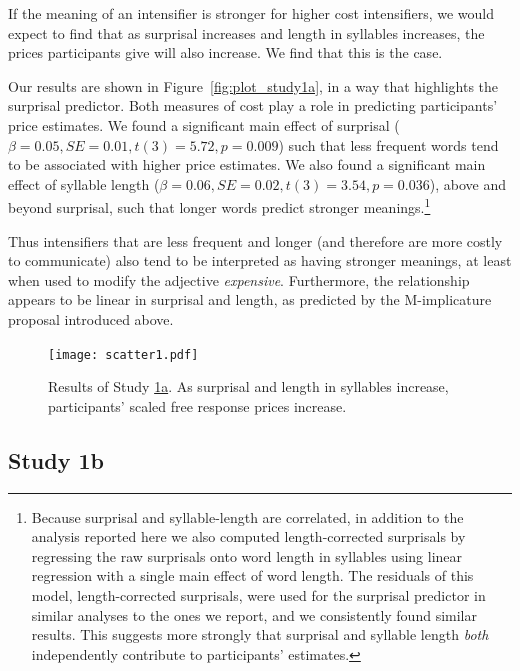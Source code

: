 \documentclass[10pt,letterpaper]{article}
\newcommand{\todo}[1]{{\color{red}#1}}
\begin{document}
\todo{

If the meaning of an intensifier is stronger for higher cost intensifiers, we would expect to find that as surprisal increases and length in syllables increases, the prices participants give will also increase. We find that this is the case.

Our results are shown in Figure~\ref{fig:plot_study1a}, in a way that highlights the surprisal predictor. Both measures of cost play a role in predicting participants' price estimates. We found a significant main effect of surprisal ($\beta=0.05, SE=0.01, t(3)=5.72, p=0.009$) such that less frequent words tend to be associated with higher price estimates. We also found a significant main effect of syllable length ($\beta=0.06, SE=0.02, t(3)=3.54, p=0.036$), above and beyond surprisal, such that longer words predict stronger meanings.\footnote{
Because surprisal and syllable-length are correlated, in addition to the analysis reported here we also computed length-corrected surprisals by regressing the raw surprisals onto word length in syllables using linear regression with a single main effect of word length. The residuals of this model, length-corrected surprisals, were used for the surprisal predictor in similar analyses to the ones we report, and we consistently found similar results. This suggests more strongly that surprisal and syllable length \emph{both} independently contribute to participants' estimates.
}
}

Thus intensifiers that are less frequent and longer (and therefore are more costly to communicate) also tend to be interpreted as having stronger meanings, at least when used to modify the adjective \emph{expensive}.
Furthermore, the relationship appears to be linear in surprisal and length, as predicted by the M-implicature proposal introduced above.

\begin{figure}[ht]
\begin{center}
\texttt{[image: scatter1.pdf]}
\end{center}
\caption{Results of Study \hyperref[sec:study1a]{1a}. As surprisal and length in syllables increase, participants' scaled free response prices increase.} 
\label{exp1-plot}
\end{figure}

\subsection{Study 1b \label{sec:study1b}}
\end{document}
